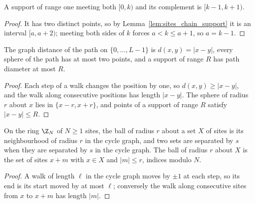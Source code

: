 \begin{lemma}
    \label{lem:sites_chain_range_one_cut}
    \leanok
    A support of range one meeting both $[0,k)$ and its complement is
    $\lbrack k-1,k+1)$.
\end{lemma}
\begin{proof}\leanok
    It has two distinct points, so by Lemma~\ref{lem:sites_chain_support} it is an
    interval $\lbrack a,a+2)$; meeting both sides of $k$ forces $a<k\le a+1$, so
    $a=k-1$.
\end{proof}

\begin{lemma}
    \label{lem:sites_path_distance}
    \leanok
    The graph distance of the path on $\{0,\dots,L-1\}$ is $d(x,y)=\lvert x-y\rvert$,
    every sphere of the path has at most two points, and a support of range $R$ has
    path diameter at most $R$.
\end{lemma}
\begin{proof}\leanok
    Each step of a walk changes the position by one, so $d(x,y)\ge\lvert x-y\rvert$, and
    the walk along consecutive positions has length $\lvert x-y\rvert$. The sphere of
    radius $r$ about $x$ lies in $\{x-r,x+r\}$, and points of a support of range $R$
    satisfy $\lvert x-y\rvert\le R$.
\end{proof}

\begin{lemma}
    \label{def:sites_ring_ball}
    \leanok
    On the ring $\Z_N$ of $N\ge1$ sites, the ball of radius $r$ about a set $X$ of sites
    is its neighbourhood of radius $r$ in the cycle graph, and two sets are separated by
    $s$ when they are separated by $s$ in the cycle graph. The ball of radius $r$ about $X$
    is the set of sites $x+m$ with $x\in X$ and $\lvert m\rvert\le r$, indices modulo $N$.
\end{lemma}
\begin{proof}\leanok
    A walk of length $\ell$ in the cycle graph moves by $\pm1$ at each step, so its end is
    its start moved by at most $\ell$; conversely the walk along consecutive sites from $x$
    to $x+m$ has length $\lvert m\rvert$.
\end{proof}

